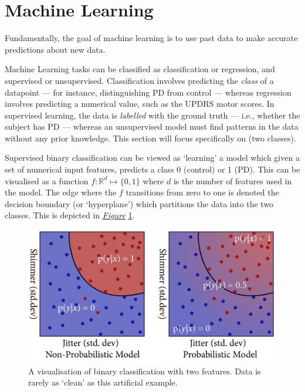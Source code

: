 \documentclass[12pt, twoside]{book}
\renewcommand\emph[1]{\textit{\color{USred}{#1}}}
\begin{document}
\egroup
\section{Machine Learning}
\label{machinelearning}
\begin{highlight}
Fundamentally, the goal of machine learning is to use past data to make accurate predictions about new data. 
\end{highlight}

Machine Learning tasks can be classified as classification or regression, and supervised or unsupervised. Classification involves predicting the \textit{class} of a datapoint --- for instance, distinguishing PD from control --- whereas regression involves predicting a numerical value, such as the UPDRS motor scores. In supervised learning, the data is \textit{labelled} with the ground truth --- i.e., whether the subject has PD --- whereas an unsupervised model must find patterns in the data without any prior knowledge. This section will focus specifically on \emph{supervised binary classification} (two classes). 

Supervised binary classification can be viewed as `learning' a model which given a set of numerical input features, predicts a class 0 (control) or 1 (PD). This can be visualised as a function $f : \mathbb{R}^d \mapsto \{0,1\}$ where $d$ is the number of features used in the model. The edge where the $f$ transitions from zero to one is denoted the decision boundary (or `hyperplane') which partitions the data into the two classes. This is depicted in \textit{\hyperref[binaryclass]{Figure}} \ref{binaryclass}.


\begin{figure}[!htb]
\centering\includegraphics[width=0.7\linewidth]{binaryclassification2.png}
\caption{A visualisation of binary classification with two features. Data is rarely as `clean' as this artificial example.}
\label{binaryclass}
\end{figure}
\end{document}
